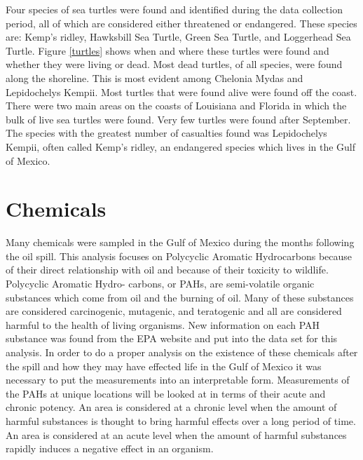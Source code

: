 \documentclass[11pt]{article}
\begin{document}
Four species of sea turtles were found and identified during the data collection period, all of which are considered either threatened or endangered. These species are: Kemp's ridley, Hawksbill Sea Turtle, Green Sea Turtle, and Loggerhead Sea Turtle. Figure \ref{turtles} shows when and where these turtles were found and whether they were living or dead. Most dead turtles, of all species, were found along the shoreline. This is most evident among Chelonia Mydas and Lepidochelys Kempii. Most turtles that were found alive were found off the coast. There were two main areas on the coasts of Louisiana and Florida in which the bulk of live sea turtles were found. Very few turtles were found after September. The species with the greatest number of casualties found was Lepidochelys Kempii, often called Kemp's ridley, an endangered species which lives in the Gulf of Mexico.

\section{Chemicals}

Many chemicals were sampled in the Gulf of Mexico during the months following the oil spill. This analysis focuses on Polycyclic Aromatic Hydrocarbons because of their direct relationship with oil and because of their toxicity to wildlife. Polycyclic Aromatic Hydro- carbons, or PAHs, are semi-volatile organic substances which come from oil and the burning of oil. Many of these substances are considered carcinogenic, mutagenic, and teratogenic and all are considered harmful to the health of living organisms. New information on each PAH substance was found from the EPA website and put into the data set for this analysis. In order to do a proper analysis on the existence of these chemicals after the spill and how they may have effected life in the Gulf of Mexico it was necessary to put the measurements into an interpretable form. Measurements of the PAHs at unique locations will be looked at in terms of their acute and chronic potency. An area is considered at a chronic level when the amount of harmful substances is thought to bring harmful effects over a long period of time. An area is considered at an acute level when the amount of harmful substances rapidly induces a negative effect in an organism.
\end{document}
